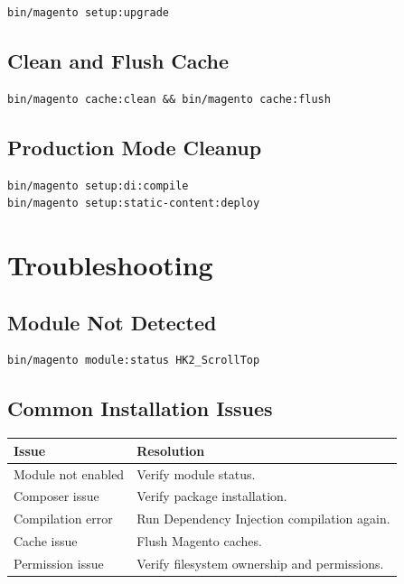 \documentclass[11pt,a4paper]{article}
\begin{document}
\begin{lstlisting}[style=shell]
bin/magento setup:upgrade
\end{lstlisting}

\subsection{Clean and Flush Cache}

\begin{lstlisting}[style=shell]
bin/magento cache:clean && bin/magento cache:flush
\end{lstlisting}

\subsection{Production Mode Cleanup}

\begin{lstlisting}[style=shell]
bin/magento setup:di:compile
bin/magento setup:static-content:deploy
\end{lstlisting}

\section{Troubleshooting}

\subsection{Module Not Detected}

\begin{lstlisting}[style=shell]
bin/magento module:status HK2_ScrollTop
\end{lstlisting}

\subsection{Common Installation Issues}

\begin{longtable}{ll}
\toprule
\textbf{Issue} & \textbf{Resolution} \\
\midrule
\endhead
Module not enabled & Verify module status. \\
Composer issue & Verify package installation. \\
Compilation error & Run Dependency Injection compilation again. \\
Cache issue & Flush Magento caches. \\
Permission issue & Verify filesystem ownership and permissions. \\
\bottomrule
\end{longtable}
\end{document}
